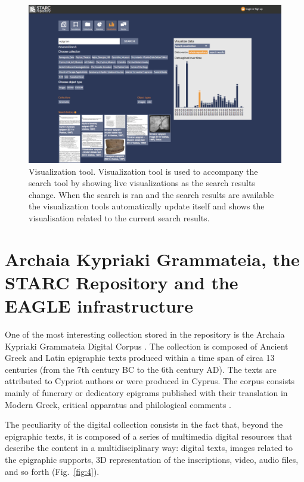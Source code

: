 \documentclass[amsthm,ebook]{saparticle}
\begin{document}
\begin{figure}[!bp]
\centering
 \includegraphics[width=\columnwidth]{DamnjanovicetalEAGLE2016-img003.png}
\caption{Visualization tool. Visualization tool is used to accompany the search tool by showing live visualizations as
the search results change. When the search is ran and the search results are available the visualization tools
automatically update itself and shows the visualisation related to the current search results. }
\label{fig:3}
\end{figure}




\section{Archaia Kypriaki Grammateia, the STARC Repository and the EAGLE infrastructure}


\noindent One of the most interesting collection stored in the repository is the Archaia Kypriaki Grammateia Digital Corpus
\citep{pitzalis_building_2012}. The collection is composed of Ancient Greek and Latin epigraphic texts produced within a time
span of circa 13 centuries (from the 7th century BC to the 6th century AD). The texts are attributed to Cypriot authors
or were produced in Cyprus. The corpus consists mainly of funerary or dedicatory epigrams published with their
translation in Modern Greek, critical apparatus and philological comments \citep{voskos__1997}. 

The peculiarity of the digital collection consists in the fact that, beyond the epigraphic texts, it is composed of a
series of multimedia digital resources that describe the content in a multidisciplinary way: digital texts, images
related to the epigraphic supports, 3D representation of the inscriptions, video, audio files, and so forth (Fig.~\ref{fig:4}).
\end{document}
